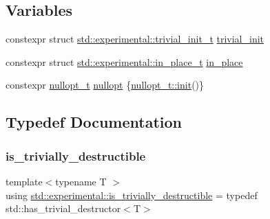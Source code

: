 \subsection*{Variables}
\begin{DoxyCompactItemize}
\item 
constexpr struct \mbox{\hyperlink{structstd_1_1experimental_1_1trivial__init__t}{std\+::experimental\+::trivial\+\_\+init\+\_\+t}} \mbox{\hyperlink{namespacestd_1_1experimental_a453a56e465f134032297679f0511f02b}{trivial\+\_\+init}}
\item 
constexpr struct \mbox{\hyperlink{structstd_1_1experimental_1_1in__place__t}{std\+::experimental\+::in\+\_\+place\+\_\+t}} \mbox{\hyperlink{namespacestd_1_1experimental_a93be82cb49ba2dc64a23c881ad152fd6}{in\+\_\+place}}
\item 
constexpr \mbox{\hyperlink{structstd_1_1experimental_1_1nullopt__t}{nullopt\+\_\+t}} \mbox{\hyperlink{namespacestd_1_1experimental_af16e944368340cafdc29647c42a1f542}{nullopt}} \{\mbox{\hyperlink{structstd_1_1experimental_1_1nullopt__t_1_1init}{nullopt\+\_\+t\+::init}}()\}
\end{DoxyCompactItemize}


\subsection{Typedef Documentation}
\mbox{\label{namespacestd_1_1experimental_a481cc29b2f00961d0afc189e6e90f739}} 
\subsubsection{\texorpdfstring{is\+\_\+trivially\+\_\+destructible}{is\_trivially\_destructible}}
{\footnotesize\ttfamily template$<$typename T $>$ \\
using \mbox{\hyperlink{namespacestd_1_1experimental_a481cc29b2f00961d0afc189e6e90f739}{std\+::experimental\+::is\+\_\+trivially\+\_\+destructible}} = typedef std\+::has\+\_\+trivial\+\_\+destructor$<$T$>$}

\mbox{\label{namespacestd_1_1experimental_a33aa5e258a2b0762197365c1ef3f90aa}} 
